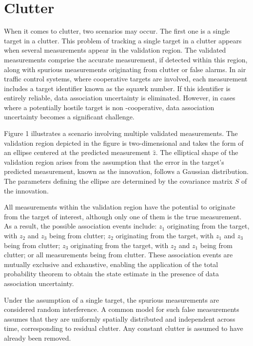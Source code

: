\section{Clutter}
When it comes to clutter, two scenarios may occur. The first one is a single target in a clutter. This problem of
tracking a single target in a clutter appears when several measurements appear in the validation region. The
validated measurements comprise the accurate measurement, if detected within this region, along with spurious
measurements originating from clutter or false alarms. In air traffic control systems, where cooperative targets are
involved, each measurement includes a target identifier known as the squawk number. If this identifier is entirely
reliable, data association uncertainty is eliminated. However, in cases where a potentially hostile target is non
-cooperative, data association uncertainty becomes a significant challenge.

Figure 1 illustrates a scenario involving multiple validated measurements. The validation region depicted in the
figure is two-dimensional and takes the form of an ellipse centered at the predicted measurement $\hat{z}$. The
elliptical shape of the validation region arises from the assumption that the error in the target's predicted
measurement, known as the innovation, follows a Gaussian distribution. The parameters defining the ellipse are
determined by the covariance matrix $S$ of the innovation.

All measurements within the validation region have the potential to originate from the target of interest, although
only one of them is the true measurement. As a result, the possible association events include: $z_1$ originating
from the target, with $z_2$ and $z_3$ being from clutter; $z_2$ originating from the target, with $z_1$ and $z_3$
being from clutter; $z_3$ originating from the target, with $z_2$ and $z_1$ being from clutter; or all measurements
being from clutter. These association events are mutually exclusive and exhaustive, enabling the application of the
total probability theorem to obtain the state estimate in the presence of data association uncertainty.

Under the assumption of a single target, the spurious measurements are considered random interference. A common model for such false measurements assumes that they are uniformly spatially distributed and independent across time, corresponding to residual clutter. Any constant clutter is assumed to have already been removed.


